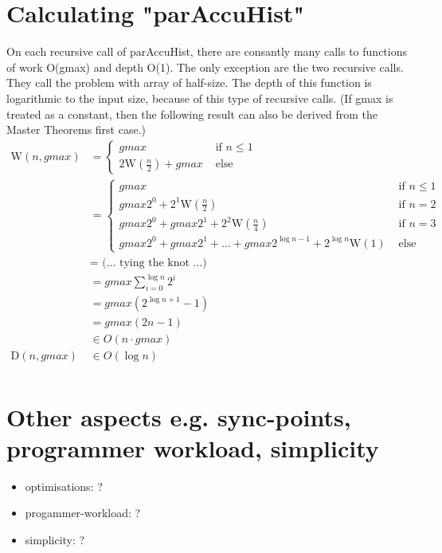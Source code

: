 \documentclass{article}
\newcommand{\W}[0]{\textrm{W}}
\newcommand{\D}[0]{\textrm{D}}
\begin{document}
    \section{Calculating "parAccuHist"}
      On each recursive call of parAccuHist, there are consantly
      many calls to functions of work O(gmax) and depth O(1).
      The only exception are the two recursive calls.
      They call the problem with array of half-size.
      The depth of this function is logarithmic to the input size,
      because of this type of recursive calls.
      (If gmax is treated as a constant, then the following result
      can also be derived from the Master Theorems first case.)
      \begin{equation}
      \begin{split}
      \W(n,gmax)
            & = \begin{cases}
                 gmax & \text{ if } n \le 1 \\ 
                 2 \W(\frac{n}{2}) + gmax & \text{ else }
                \end{cases} \\
            & = \begin{cases}
                  gmax & \text{ if } n \le 1 \\ 
                  gmax2^0 + 2^1\W(\frac{n}{2}) & \text{ if } n = 2 \\
                  gmax2^0 + gmax2^1 + 2^2\W(\frac{n}{4}) & \text{ if } n = 3 \\
                  gmax2^0 + gmax2^1 + ... + gmax 2^{\log n - 1} + 2^{\log n}\W(1) & \text{ else }
                \end{cases} \\
            & = \textrm{ (... tying the knot ...) } \\
            & = gmax \sum_{i=0}^{\log n}{2^i} \\
            & = gmax (2^{\log n + 1} - 1) \\
            & = gmax (2n - 1) \\
            & \in O(n \cdot gmax) \\
      \D(n,gmax)
          & \in O(\log n) \\
      \end{split}
      \end{equation}
    \section{Other aspects \small{e.g. sync-points, programmer workload, simplicity}}
      \begin{itemize}
        \item optimisations:
          ?
        \item progammer-workload: ?
        \item simplicity: ?
      \end{itemize}
      
\end{document}
